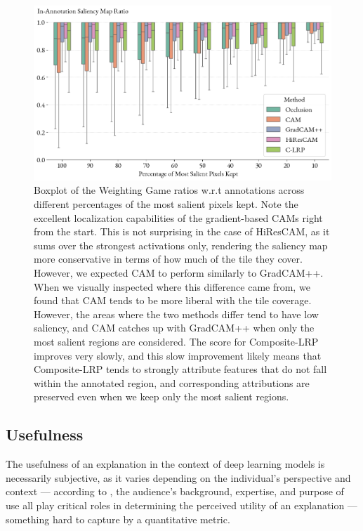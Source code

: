 \begin{figure}
    \begin{center}
    \begin{minipage}{1\textwidth}
      \includegraphics[width=\textwidth]{img/weighting-game-boxplot.png}
    \end{minipage}
    \caption{
    Boxplot of the Weighting Game ratios w.r.t annotations across different percentages of the most salient pixels kept.
    Note the excellent localization capabilities of the gradient-based CAMs right from the start.
    This is not surprising in the case of HiResCAM, as it sums over the strongest activations only, rendering the saliency map more conservative in terms of how much of the tile they cover.
    However, we expected CAM to perform similarly to GradCAM++.
    When we visually inspected where this difference came from, we found that CAM tends to be more liberal with the tile coverage.
    However, the areas where the two methods differ tend to have low saliency, and CAM catches up with GradCAM++ when only the most salient regions are considered.
    The score for Composite-LRP improves very slowly, and this slow improvement likely means that Composite-LRP tends to strongly attribute features that do not fall within the annotated region, and corresponding attributions are preserved even when we keep only the most salient regions.
    }
    \label{fig:weighting-game-boxplot}
    \end{center}
\end{figure}

\subsection*{Usefulness}

The usefulness of an explanation in the context of deep learning models is necessarily subjective, as it varies depending on the individual's perspective and context --- according to \cite{xai-doshi}, the audience's background, expertise, and purpose of use all play critical roles in determining the perceived utility of an explanation --- something hard to capture by a quantitative metric.

